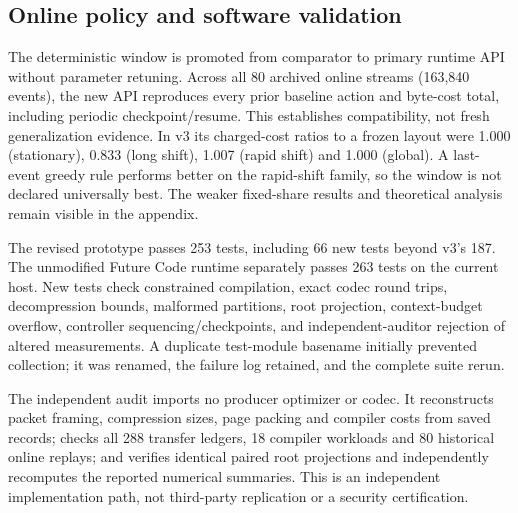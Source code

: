 \subsection{Online policy and software validation}
The deterministic window is promoted from comparator to primary runtime API without parameter retuning. Across all 80 archived online streams (163,840 events), the new API reproduces every prior baseline action and byte-cost total, including periodic checkpoint/resume. This establishes compatibility, not fresh generalization evidence. In v3 its charged-cost ratios to a frozen layout were 1.000 (stationary), 0.833 (long shift), 1.007 (rapid shift) and 1.000 (global). A last-event greedy rule performs better on the rapid-shift family, so the window is not declared universally best. The weaker fixed-share results and theoretical analysis remain visible in the appendix.

The revised prototype passes 253 tests, including 66 new tests beyond v3's 187. The unmodified Future Code runtime separately passes 263 tests on the current host. New tests check constrained compilation, exact codec round trips, decompression bounds, malformed partitions, root projection, context-budget overflow, controller sequencing/checkpoints, and independent-auditor rejection of altered measurements. A duplicate test-module basename initially prevented collection; it was renamed, the failure log retained, and the complete suite rerun.

The independent audit imports no producer optimizer or codec. It reconstructs packet framing, compression sizes, page packing and compiler costs from saved records; checks all 288 transfer ledgers, 18 compiler workloads and 80 historical online replays; and verifies identical paired root projections and independently recomputes the reported numerical summaries. This is an independent implementation path, not third-party replication or a security certification.
